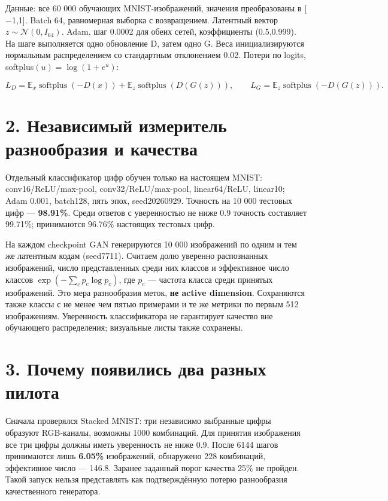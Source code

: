 \documentclass[10pt,a4paper]{article}
\begin{document}
Данные: все 60 000 обучающих MNIST-изображений, значения преобразованы в [\ensuremath{-}1,1]. Batch 64, равномерная выборка с возвращением. Латентный вектор $z\sim\mathcal N(0,I_{64})$. Adam, шаг 0.0002 для обеих сетей, коэффициенты (0.5,0.999). На шаге выполняется одно обновление D, затем одно G. Веса инициализируются нормальным распределением со стандартным отклонением 0.02. Потери по logits, softplus$(u)=\log(1+e^u)$:

\[
L_D=\mathbb E_x\operatorname{softplus}(-D(x))+
\mathbb E_z\operatorname{softplus}(D(G(z))),\qquad
L_G=\mathbb E_z\operatorname{softplus}(-D(G(z))).
\]

\section*{2. Независимый измеритель разнообразия и качества}

Отдельный классификатор цифр обучен только на настоящем MNIST: conv16/ReLU/max-pool, conv32/ReLU/max-pool, linear64/ReLU, linear10; Adam 0.001, batch128, пять эпох, seed20260929. Точность на 10 000 тестовых цифр --- \textbf{98.91\%}. Среди ответов с уверенностью не ниже 0.9 точность составляет 99.71\%; принимаются 96.76\% настоящих тестовых цифр.

На каждом checkpoint GAN генерируются 10 000 изображений по одним и тем же латентным кодам (seed7711). Считаем долю уверенно распознанных изображений, число представленных среди них классов и эффективное число классов $\exp(-\sum_c p_c\log p_c)$, где $p_c$ --- частота класса среди принятых изображений. Это мера разнообразия меток, \textbf{не active dimension}. Сохраняются также классы с не менее чем пятью примерами и те же метрики по первым 512 изображениям. Уверенность классификатора не гарантирует качество вне обучающего распределения; визуальные листы также сохранены.

\newpage

\section*{3. Почему появились два разных пилота}

Сначала проверялся Stacked MNIST: три независимо выбранные цифры образуют RGB-каналы, возможны 1000 комбинаций. Для принятия изображения все три цифры должны иметь уверенность не ниже 0.9. После 6144 шагов принимаются лишь \textbf{6.05\%} изображений, обнаружено 228 комбинаций, эффективное число --- 146.8. Заранее заданный порог качества 25\% не пройден. Такой запуск нельзя представлять как подтверждённую потерю разнообразия качественного генератора.
\end{document}
